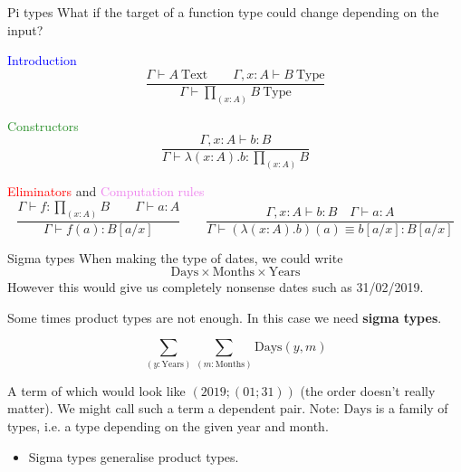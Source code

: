 \documentclass[usenames,dvipsnames]{beamer}
\newcommand{\blu}[1]{\textcolor{blue}{#1}}
\newcommand{\gre}[1]{\textcolor{ForestGreen}{#1}}
\newcommand{\red}[1]{\textcolor{red}{#1}}
\newcommand{\yel}[1]{\textcolor{violet}{#1}}
\begin{document}
    \begin{frame}{Pi types}
        What if the target of a function type could change depending on the input?
        \begin{block}{\blu{Introduction}}
            $$\frac{\Gamma \vdash A\ \text{Text} \qquad \Gamma, x : A \vdash B\ \text{Type}}{\Gamma \vdash \prod_{(x:A)}B\ \text{Type}}$$
        \end{block}
        
        \begin{block}{\gre{Constructors}}
            $$\frac{\Gamma , x : A \vdash b : B}{\Gamma \vdash \lambda (x : A) . b : \prod_{(x:A)}B}$$
        \end{block}
        
        \begin{block}{\red{Eliminators} and \yel{Computation rules}}
            $$\frac{\Gamma \vdash f : \prod_{(x:A)}B \qquad \Gamma \vdash a : A}{\Gamma \vdash f(a) : B[a/x]}\qquad 
              \frac{\Gamma , x : A \vdash b : B \quad \Gamma \vdash a : A}{\Gamma \vdash (\lambda(x:A).b)(a)\equiv b[a/x]:B[a/x]} $$
        \end{block}
    \end{frame}
    
    \begin{frame}{Sigma types}
        When making the type of dates, we could write
        $$\text{Days} \times \text{Months} \times \text{Years}$$
        However this would give us completely nonsense dates such as 31/02/2019.

        Some times product types are not enough. In this case we need \textbf{sigma types}. 

        $$\sum_{(y : \text{Years})} \sum_{(m : \text{Months})} \text{Days}(y, m)$$
        
        A term of which would look like $(2019; (01; 31))$ (the order doesn't really matter). We might call such a term a dependent pair.
        Note: $\text{Days}$ is a family of types, i.e. a type depending on the given year and month.
        \begin{itemize}
        
            \item Sigma types generalise product types.   
        \end{itemize}
    \end{frame}
     
\end{document}
